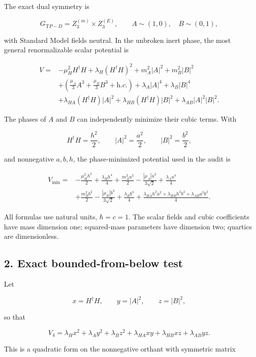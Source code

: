 \documentclass[
]{article}
\begin{document}
The exact dual symmetry is

\[
G_{\mathrm TP-D}=Z_3^{(m)}\times Z_3^{(E)},
\qquad
A\sim(1,0),\quad B\sim(0,1),
\]

with Standard Model fields neutral. In the unbroken inert phase, the
most general renormalizable scalar potential is

\[
\begin{aligned}
V={}&-\mu_H^2H^\dagger H+\lambda_H(H^\dagger H)^2
+m_A^2|A|^2+m_B^2|B|^2\\
&+\left(\frac{\mu_A}{3}A^3+\frac{\mu_B}{3}B^3+{\mathrm h.c.}\right)
+\lambda_A|A|^4+\lambda_B|B|^4\\
&+\lambda_{HA}(H^\dagger H)|A|^2
+\lambda_{HB}(H^\dagger H)|B|^2
+\lambda_{AB}|A|^2|B|^2.
\end{aligned}
\]

The phases of \(A\) and \(B\) can independently minimize their cubic
terms. With

\[
H^\dagger H=\frac{h^2}{2},\qquad |A|^2=\frac{a^2}{2},\qquad |B|^2=\frac{b^2}{2},
\]

and nonnegative \(a,b,h\), the phase-minimized potential used in the
audit is

\[
\begin{aligned}
V_{\min}={}&-\frac{\mu_H^2h^2}{2}+\frac{\lambda_Hh^4}{4}
+\frac{m_A^2a^2}{2}-\frac{|\mu_A|a^3}{3\sqrt2}+\frac{\lambda_Aa^4}{4}\\
&+\frac{m_B^2b^2}{2}-\frac{|\mu_B|b^3}{3\sqrt2}+\frac{\lambda_Bb^4}{4}
+\frac{\lambda_{HA}h^2a^2+\lambda_{HB}h^2b^2+\lambda_{AB}a^2b^2}{4}.
\end{aligned}
\]

All formulas use natural units, \(\hbar=c=1\). The scalar fields and
cubic coefficients have mass dimension one; squared-mass parameters have
dimension two; quartics are dimensionless.

\hypertarget{exact-bounded-from-below-test}{%
\subsection{2. Exact bounded-from-below
test}\label{exact-bounded-from-below-test}}

Let

\[
x=H^\dagger H,\qquad y=|A|^2,\qquad z=|B|^2,
\]

so that

\[
V_4=\lambda_Hx^2+\lambda_Ay^2+\lambda_Bz^2
+\lambda_{HA}xy+\lambda_{HB}xz+\lambda_{AB}yz.
\]

This is a quadratic form on the nonnegative orthant with symmetric
matrix
\end{document}
